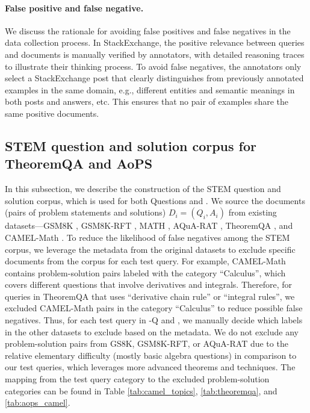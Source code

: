 \paragraph{False positive and false negative.} We discuss the rationale for avoiding false positives and false negatives in the data collection process.
In StackExchange, the positive relevance between queries and documents is manually verified by annotators, with detailed reasoning traces to illustrate their thinking process.
To avoid false negatives, the annotators only select a StackExchange post that clearly distinguishes from previously annotated examples in the same domain, e.g., different entities and semantic meanings in both posts and answers, etc.
This ensures that no pair of examples share the same positive documents.

\subsection{STEM question and solution corpus for TheoremQA and AoPS}
\label{app:data:stem_corpus}
In this subsection, we describe the construction of the STEM question and solution corpus, which is used for both \theorem Questions and \aops. 
We source the documents (pairs of problem statements and solutions) $D_i = (Q_i, A_i)$ from existing datasets---GSM8K \citep{cobbe2021training}, GSM8K-RFT \citep{yuan2023scaling}, MATH \citep{hendrycks2021measuring}, AQuA-RAT \citep{ling-etal-2017-program}, TheoremQA \citep{chen-etal-2023-theoremqa}, and CAMEL-Math \citep{li2023camel}.
To reduce the likelihood of false negatives among the STEM corpus, we leverage the metadata from the original datasets to exclude specific documents from the corpus for each test query.
For example, CAMEL-Math contains problem-solution pairs labeled with the category ``Calculus'', which covers different questions that involve derivatives and integrals.
Therefore, for queries in TheoremQA that uses ``derivative chain rule'' or ``integral rules'', we excluded CAMEL-Math pairs in the category ``Calculus'' to reduce possible false negatives.
Thus, for each test query in \theorem-Q and \aops, we manually decide which labels in the other datasets to exclude based on the metadata.
We do not exclude any problem-solution pairs from GS8K, GSM8K-RFT, or AQuA-RAT due to the relative elementary difficulty (mostly basic algebra questions) in comparison to our test queries, which leverages more advanced theorems and techniques.
The mapping from the test query category to the excluded problem-solution categories can be found in Table \ref{tab:camel_topics}, \ref{tab:theoremqa}, and \ref{tab:aops_camel}.

